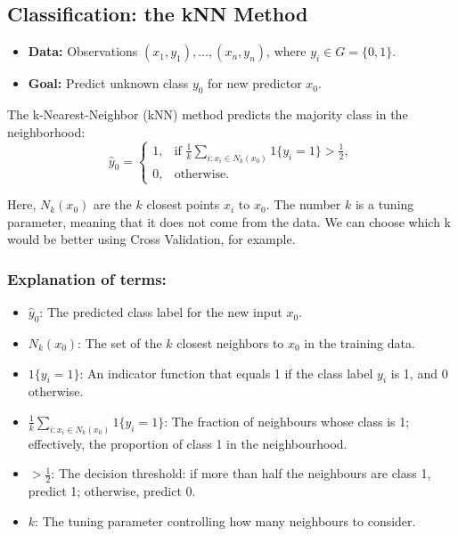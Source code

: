 \documentclass[
  letterpaper,
  DIV=11,
  numbers=noendperiod]{scrartcl}
\begin{document}
\subsection{Classification: the kNN
Method}\label{classification-the-knn-method}

\begin{itemize}
\item
  \textbf{Data:} Observations \((x_1, y_1), \ldots, (x_n, y_n)\), where
  \(y_i \in G = \{0, 1\}\).
\item
  \textbf{Goal:} Predict unknown class \(y_0\) for new predictor
  \(x_0\).
\end{itemize}

The k-Nearest-Neighbor (kNN) method predicts the majority class in the
neighborhood:\[ \hat{y}_0 = \begin{cases}
1, & \text{if } \frac{1}{k} \sum_{i : x_i \in N_k(x_0)} 1\{y_i = 1\} > \frac{1}{2}, \\
0, & \text{otherwise}.
\end{cases} \]

Here, \(N_k(x_0)\) are the \(k\) closest points \(x_i\) to \(x_0\). The
number \(k\) is a tuning parameter, meaning that it does not come from
the data. We can choose which k would be better using Cross Validation,
for example.

\subsubsection{Explanation of terms:}\label{explanation-of-terms}

\begin{itemize}
\item
  \(\hat{y}_0\): The predicted class label for the new input \(x_0\).
\item
  \(N_k(x_0)\): The set of the \(k\) closest neighbors to \(x_0\) in the
  training data.
\item
  \(1\{y_i = 1\}\): An indicator function that equals 1 if the class
  label \(y_i\) is 1, and 0 otherwise.
\item
  \(\frac{1}{k} \sum_{i : x_i \in N_k(x_0)} 1\{y_i = 1\}\): The fraction
  of neighbours whose class is 1; effectively, the proportion of class 1
  in the neighbourhood.
\item
  \(> \frac{1}{2}\): The decision threshold: if more than half the
  neighbours are class 1, predict 1; otherwise, predict 0.
\item
  \(k\): The tuning parameter controlling how many neighbours to
  consider.
\end{itemize}
\end{document}
